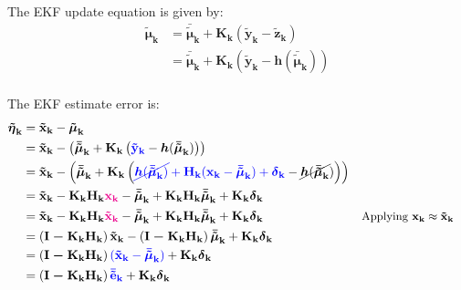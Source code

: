 \documentclass[12pt]{article}
\newcommand{\bvec}[1]{\boldsymbol{\mathbf{#1}}} %
\newcommand{\mat}[1]{\boldsymbol{\mathbf{#1}}}
\newcommand{\parentheses}[1]{\left(#1\right)}
\newcommand{\mb}[1]{{\boldsymbol{#1}}} %
\newcommand{\blue}[1]{\color{blue}#1\color{black}}
\newcommand{\magenta}[1]{\color{magenta}#1\color{black}}
\begin{document}
The EKF update equation is given by:
\begin{equation}
\begin{aligned}
    \mb{\tilde\mu}_\mathbf{k} &= \mb{\bar{\tilde\mu}}_\mathbf{k} + \mat{K_k}\parentheses{\bvec{\tilde{y}_k} - \bvec{\tilde{z}_k}}\\
    &= \mb{\bar{\tilde\mu}}_\mathbf{k} + \mat{K_k}\parentheses{\bvec{\tilde{y}_k} - \mb{h}(\mb{\bar{\tilde\mu}}_\mathbf{k})}\\
    \label{eq:ekf-update}
\end{aligned}
\end{equation}

The EKF estimate error is:
\begin{equation}
\begin{aligned}
    \mb{\tilde\eta}_\mathbf{k} &= \bvec{\tilde{x}_k} - \mb{\tilde{\mu}}_\mathbf{k}\\
    &= \bvec{\tilde{x}_k} - \parentheses{\mb{\bar{\tilde\mu}}_\mathbf{k} + \mat{K_k}\parentheses{\blue{\bvec{\tilde{y}_k}}
        - \mb{h}(\mb{\bar{\tilde\mu}}_\mathbf{k})}}\\
    &= \bvec{\tilde{x}_k} - \parentheses{\mb{\bar{\tilde\mu}}_\mathbf{k} 
    + \mat{K_k}\parentheses{\blue{\cancel{\mb{h}(
        \mb{\bar{\tilde\mu}}_\mathbf{k})} + \mat{H_k}(\bvec{x_k} 
        - \mb{\bar{\tilde{\mu}}}_\mathbf{k}) 
        + \mb{\delta}_\mathbf{k}} 
        - \cancel{\mb{h}(\mb{\bar{\tilde\mu}}_\mathbf{k}})}}\\
    &= \bvec{\tilde{x}_k} - \mat{K_k H_k} \magenta{\bvec{x_k}}
    - \mb{\bar{\tilde{\mu}}}_\mathbf{k} + \mat{K_k H_k}
    \mb{\bar{\tilde{\mu}}}_\mathbf{k} + \mat{K_k} \mb{\delta}_\mathbf{k}\\
    &= \bvec{\tilde{x}_k} - \mat{K_k H_k} \magenta{\bvec{\tilde{x}_k}}
    - \mb{\bar{\tilde{\mu}}}_\mathbf{k} + \mat{K_k H_k}
    \mb{\bar{\tilde{\mu}}}_\mathbf{k} + \mat{K_k} \mb{\delta}_\mathbf{k}
    && \small\text{Applying $\bvec{x_k} \approx \bvec{\tilde{x}_k}$}\\
    &= \parentheses{\mat{I - K_k H_k}}\bvec{\tilde{x}_k} 
    -\parentheses{\mat{I - K_k H_k}}\mb{\bar{\tilde{\mu}}}_\mathbf{k}
    + \mat{K_k} \mb{\delta}_\mathbf{k}\\
    &= \parentheses{\mat{I - K_k H_k}} \blue{(\bvec{\tilde{x}_k} 
    - \mb{\bar{\tilde{\mu}}}_\mathbf{k})} 
    + \mat{K_k} \mb{\delta}_\mathbf{k}\\
    &= \parentheses{\mat{I - K_k H_k}} \blue{\bvec{\bar{\tilde{e}}_k}} 
    + \mat{K_k} \mb{\delta}_\mathbf{k}
\end{aligned}
\end{equation}
\end{document}
